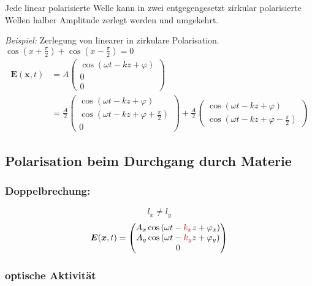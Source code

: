 \documentclass[titlepage,11pt,a4paper,ngerman]{report}
\renewcommand{\vec}[1]{\boldsymbol{#1}}
\newcommand{\rbox}[1]{\begin{tcolorbox}[colback=white,colframe=red!75!black]#1\end{tcolorbox}}
\begin{document}
\rbox{Jede linear polarisierte Welle kann in zwei entgegengesetzt zirkular polarisierte Wellen halber Amplitude zerlegt werden und umgekehrt.}
\emph{Beispiel:} Zerlegung von linearer in zirkulare Polarisation.
$ \cos\left( x + \frac{\pi}{2}\right) + \cos\left( x - \frac{\pi}{2}\right) = 0 $
\begin{align*}
\vec{E}(\vec{x},t) &= A \begin{pmatrix}
\cos\left(\omega t - k z + \varphi\right) \\ 0 \\ 0
\end{pmatrix} \\
&= \frac{A}{2} \begin{pmatrix}
\cos\left(\omega t - k z + \varphi \right) \\ \cos\left(\omega t - k z + \varphi + \frac{\pi}{2}\right) \\ 0
\end{pmatrix} + \frac{A}{2} \begin{pmatrix}
\cos \left(\omega t - k z + \varphi\right) \\ \cos \left(\omega t -  k z + \varphi - \frac{\pi}{2}\right)
\end{pmatrix}
\end{align*}

\subsection{Polarisation beim Durchgang durch Materie}

\subsubsection{Doppelbrechung:}

\begin{equation*}
l_x \neq l_y
\end{equation*}
\begin{equation*}
\vec{E}(\vec{x},t) = \begin{pmatrix}
A_x \cos\left(\omega t - \color{black!30!red}k_x\color{black}z + \varphi_x\right) \\ A_y \cos\left(\omega t - \color{black!30!red}k_y\color{black}z + \varphi_y \right) \\ 0
\end{pmatrix}
\end{equation*}

\subsubsection{optische Aktivität}
\end{document}
